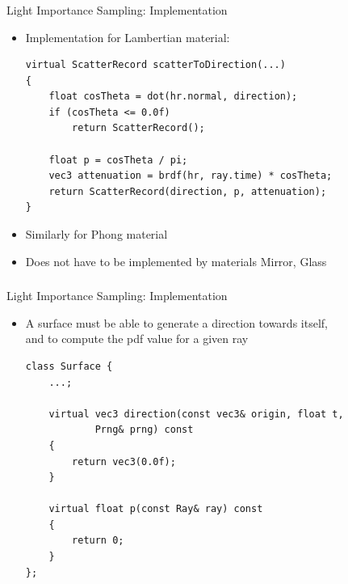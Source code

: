 \documentclass[utf8,stillsansserifmath,fleqn,t]{beamer}
\begin{document}
\begin{frame}[fragile]
\frametitle{\insertsection}
Light Importance Sampling: Implementation
\begin{itemize}
\item Implementation for Lambertian material:
\begin{lstlisting}
virtual ScatterRecord scatterToDirection(...)
{
    float cosTheta = dot(hr.normal, direction);
    if (cosTheta <= 0.0f)
        return ScatterRecord();

    float p = cosTheta / pi;
    vec3 attenuation = brdf(hr, ray.time) * cosTheta;
    return ScatterRecord(direction, p, attenuation);
}
\end{lstlisting}
\item Similarly for Phong material
\item Does not have to be implemented by materials Mirror, Glass
\end{itemize}
\end{frame}

\begin{frame}[fragile,label=light-importance-sampling-2]
\frametitle{\insertsection}
Light Importance Sampling: Implementation
\begin{itemize}
\item A surface must be able to generate a direction towards itself,\\
and to compute the pdf value for a given ray
\begin{lstlisting}
class Surface {
    ...;

    virtual vec3 direction(const vec3& origin, float t,
            Prng& prng) const
    {
        return vec3(0.0f);
    }

    virtual float p(const Ray& ray) const
    {
        return 0;
    }
};
\end{lstlisting}
\end{itemize}
\end{frame}
\end{document}
